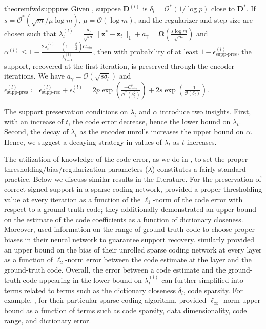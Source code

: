 \documentclass[10pt]{article} %
\newcommand{\D}{{\bm D}}
\newcommand{\z}{{\bm z}}
\begin{document}
\begin{restatable}{theorem}{fwdsupppres}\label{thm:supppres}
Given , suppose $\D^{(l)}$ is $\delta_l = \mathcal{O}^{\ast}(1 / \log{p})$ close to $\D^{\ast}$. If $s = \mathcal{O}^{\ast}(\sqrt{m} / \mu \log{m})$, $\mu = \mathcal{O}(\log{m})$, and the regularizer and step size are chosen such that $\lambda_t^{(l)} = \frac{\mu_l}{\sqrt{m}} \| \z^{\ast} - \z_t \|_1 + a_{\gamma} = {\bm \Omega}(\frac{s \log{m}}{\sqrt{m}})$ and 
$\alpha^{(l)} \leq 1 - \frac{2\lambda_t^{(l)} - (1 - \frac{\delta_l^2}{2}) C_{\min}}{\lambda_{t-1}^{(l)}}$, then with probability of at least $1 - \epsilon^{(l)}_{\text{supp-pres}}$, the support, recovered at the first iteration, is preserved through the encoder iterations. We have $a_{\gamma} = \mathcal{O}(\sqrt{s\delta_l})$ and $\epsilon^{(l)}_{\text{supp-pres}} \coloneqq \epsilon^{(l)}_{\text{supp-rec}} + \epsilon^{(l)}_{\gamma} = 2 p \exp{(\frac{-C_{\min}^2}{\mathcal{O}^{\ast}(\delta_l^2)})}+ 2 s \exp{(\frac{-1}{\mathcal{O}(\delta_l)})}$.
\end{restatable}
%
The support preservation conditions on $\lambda_t$ and $\alpha$ introduce two insights. First, with an increase of $t$, the code error decrease, hence the lower bound on $\lambda_t$. Second, the decay of $\lambda_t$ as the encoder unrolls increases the upper bound on $\alpha$. Hence, we suggest a decaying strategy in values of $\lambda_t$ as $t$ increases.

The utilization of knowledge of the code error, as we do in , to set the proper thresholding/bias/regularization parameters ($\lambda$) constitutes a fairly standard practice. Below we discuss similar results in the literature. For the preservation of correct signed-support in a sparse coding network, \citet{rambhatla2018noodl} provided a proper thresholding value at every iteration as a function of the $\ell_1$-norm of the code error with respect to a ground-truth code; they additionally demonstrated an upper bound on the estimate of the code coefficients as a function of dictionary closeness. Moreover, \citet{nguyen2019dynamics} used information on the range of ground-truth code to choose proper biases in their neural network to guarantee support recovery. \citet{chen2018unfoldista} similarly provided an upper bound on the bias of their unrolled sparse coding network at every layer as a function of $\ell_2$-norm error between the code estimate at the layer and the ground-truth code. Overall, the error between a code estimate and the ground-truth code appearing in the lower bound on $\lambda_t^{(l)}$ can further simplified into terms related to terms such as the dictionary closeness $\delta_l$, code sparsity. For example, \citet{chatterji2017alternating}, for their particular sparse coding algorithm, provided $\ell_{\infty}$-norm upper bound as a function of terms such as code sparsity, data dimensionality, code range, and dictionary error.
%
\end{document}
